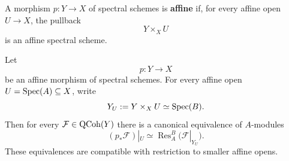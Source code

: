 \begin{definition}
\label{def:affine-morphism-spectral-schemes}
A morphism $p:Y\to X$ of spectral schemes is \textbf{affine} if, for every
affine open $U\to X$, the pullback
\[
    Y\times_XU
\]
is an affine spectral scheme.
\end{definition}

\begin{proposition}
\label{prop:affine-direct-image-restriction-scalars}
Let
\[
    p:Y\longrightarrow X
\]
be an affine morphism of spectral schemes. For every affine open
\(U=\operatorname{Spec}(A)\subseteq X\), write
\[
    Y_U:=Y\times_XU\simeq\operatorname{Spec}(B).
\]
Then for every \(\mathcal F\in\operatorname{QCoh}(Y)\) there is a canonical equivalence
of \(A\)-modules
\[
    (p_*\mathcal F)|_U
    \simeq
    \operatorname{Res}_A^B
    \bigl(\mathcal F|_{Y_U}\bigr).
\]
These equivalences are compatible with restriction to smaller affine opens.
\end{proposition}

